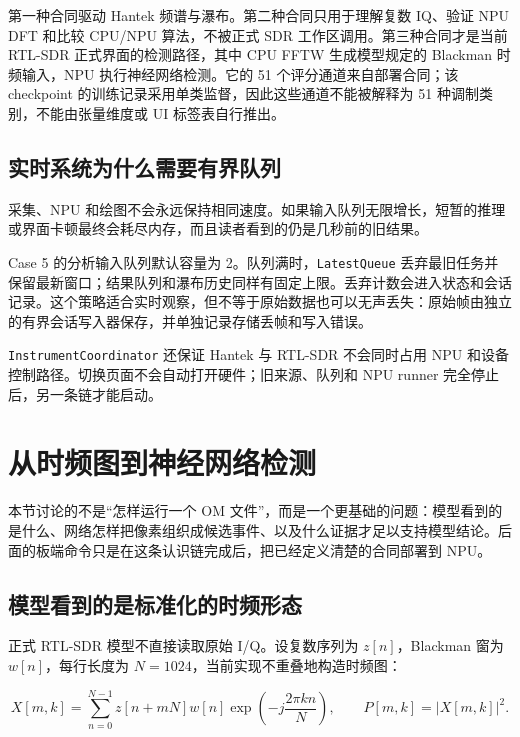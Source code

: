 第一种合同驱动 Hantek 频谱与瀑布。第二种合同只用于理解复数 IQ、验证 NPU
DFT 和比较 CPU/NPU 算法，不被正式 SDR 工作区调用。第三种合同才是当前
RTL-SDR 正式界面的检测路径，其中 CPU FFTW 生成模型规定的 Blackman
时频输入，NPU 执行神经网络检测。它的 51 个评分通道来自部署合同；该
checkpoint 的训练记录采用单类监督，因此这些通道不能被解释为 51
种调制类别，不能由张量维度或 UI 标签表自行推出。

\subsection{实时系统为什么需要有界队列}\label{src-experiment-case5-bounded-queues}

采集、NPU
和绘图不会永远保持相同速度。如果输入队列无限增长，短暂的推理或界面卡顿最终会耗尽内存，而且读者看到的仍是几秒前的旧结果。

Case 5 的分析输入队列默认容量为
2。队列满时，\passthrough{\lstinline!LatestQueue!}
丢弃最旧任务并保留最新窗口；结果队列和瀑布历史同样有固定上限。丢弃计数会进入状态和会话记录。这个策略适合实时观察，但不等于原始数据也可以无声丢失：原始帧由独立的有界会话写入器保存，并单独记录存储丢帧和写入错误。

\passthrough{\lstinline!InstrumentCoordinator!} 还保证 Hantek 与 RTL-SDR
不会同时占用 NPU
和设备控制路径。切换页面不会自动打开硬件；旧来源、队列和 NPU runner
完全停止后，另一条链才能启动。

\section{从时频图到神经网络检测}\label{src-experiment-case5-neural-detection}

本节讨论的不是``怎样运行一个 OM
文件''，而是一个更基础的问题：模型看到的是什么、网络怎样把像素组织成候选事件、以及什么证据才足以支持模型结论。后面的板端命令只是在这条认识链完成后，把已经定义清楚的合同部署到
NPU。

\subsection{模型看到的是标准化的时频形态}\label{src-experiment-case5-spectrogram-representation}

正式 RTL-SDR 模型不直接读取原始 I/Q。设复数序列为 \(z[n]\)，Blackman
窗为 \(w[n]\)，每行长度为 \(N=1024\)，当前实现不重叠地构造时频图：

\[
X[m,k]=\sum_{n=0}^{N-1}z[n+mN]w[n]\exp\left(-j\frac{2\pi kn}{N}\right),
\qquad P[m,k]=|X[m,k]|^2.
\]

